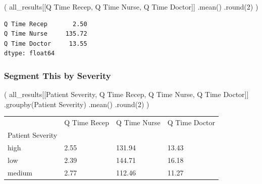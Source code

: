 \documentclass[
  letterpaper,
  DIV=11,
  numbers=noendperiod]{scrreprt}
\newenvironment{Shaded}{}{}
\newcommand{\BuiltInTok}[1]{\textcolor[rgb]{0.84,0.23,0.29}{#1}}
\newcommand{\DecValTok}[1]{\textcolor[rgb]{0.00,0.36,0.77}{#1}}
\newcommand{\NormalTok}[1]{\textcolor[rgb]{0.14,0.16,0.18}{#1}}
\newcommand{\StringTok}[1]{\textcolor[rgb]{0.01,0.18,0.38}{#1}}
\begin{document}
\begin{Shaded}
\begin{Highlighting}[]
\NormalTok{(}
\NormalTok{    all\_results[[}\StringTok{\textquotesingle{}Q Time Recep\textquotesingle{}}\NormalTok{, }\StringTok{\textquotesingle{}Q Time Nurse\textquotesingle{}}\NormalTok{, }\StringTok{\textquotesingle{}Q Time Doctor\textquotesingle{}}\NormalTok{]]}
\NormalTok{    .mean()}
\NormalTok{    .}\BuiltInTok{round}\NormalTok{(}\DecValTok{2}\NormalTok{)}
\NormalTok{)}
\end{Highlighting}
\end{Shaded}

\begin{verbatim}
Q Time Recep       2.50
Q Time Nurse     135.72
Q Time Doctor     13.55
dtype: float64
\end{verbatim}

\subsubsection{Segment This by Severity}\label{segment-this-by-severity}

\begin{Shaded}
\begin{Highlighting}[]
\NormalTok{(}
\NormalTok{    all\_results[[}\StringTok{\textquotesingle{}Patient Severity\textquotesingle{}}\NormalTok{, }\StringTok{\textquotesingle{}Q Time Recep\textquotesingle{}}\NormalTok{, }\StringTok{\textquotesingle{}Q Time Nurse\textquotesingle{}}\NormalTok{, }\StringTok{\textquotesingle{}Q Time Doctor\textquotesingle{}}\NormalTok{]]}
\NormalTok{    .groupby(}\StringTok{\textquotesingle{}Patient Severity\textquotesingle{}}\NormalTok{)}
\NormalTok{    .mean()}
\NormalTok{    .}\BuiltInTok{round}\NormalTok{(}\DecValTok{2}\NormalTok{)}
\NormalTok{)}
\end{Highlighting}
\end{Shaded}

\begin{longtable}[]{@{}llll@{}}
\toprule\noalign{}
& Q Time Recep & Q Time Nurse & Q Time Doctor \\
Patient Severity & & & \\
\midrule\noalign{}
\endhead
\bottomrule\noalign{}
\endlastfoot
high & 2.55 & 131.94 & 13.43 \\
low & 2.39 & 144.71 & 16.18 \\
medium & 2.77 & 112.46 & 11.27 \\
\end{longtable}
\end{document}
